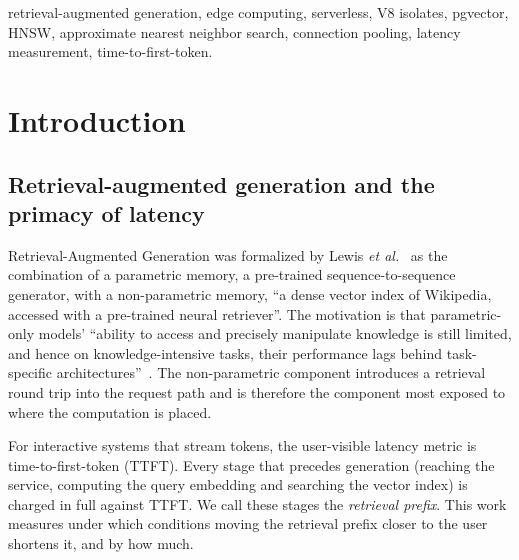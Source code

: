 \documentclass[conference]{IEEEtran}
\begin{document}
\begin{abstract}
beats the pooled Worker in three of the four remote regions. An additive latency model predicts the
centralized and near-replica topologies within 4 percent and underestimates the pooled and
unpooled paths by 7 to 42 percent; we report the calibrated parameters. Separate measurements of
the retrieval tier on one million MS~MARCO passage embeddings show HNSW serving 10 to 19 times
faster than IVFFlat at equal or higher recall where IVFFlat reaches Recall@10 of 0.93 or more and 82 times faster than an exact scan at
Recall@10 of 0.994, and confirm that the on-disk HNSW index size is fixed by page packing rather
than graph degree. Code,
harnesses and raw data are released.
\end{abstract}

\begin{IEEEkeywords}
retrieval-augmented generation, edge computing, serverless, V8 isolates, pgvector, HNSW,
approximate nearest neighbor search, connection pooling, latency measurement, time-to-first-token.
\end{IEEEkeywords}

\section{Introduction}

\subsection{Retrieval-augmented generation and the primacy of latency}
Retrieval-Augmented Generation was formalized by Lewis \emph{et al.}~\cite{lewis2020} as the
combination of a parametric memory, a pre-trained sequence-to-sequence generator, with a
non-parametric memory, ``a dense vector index of Wikipedia, accessed with a pre-trained neural
retriever''. The motivation is that parametric-only models' ``ability to access and precisely
manipulate knowledge is still limited, and hence on knowledge-intensive tasks, their performance
lags behind task-specific architectures''~\cite{lewis2020}. The non-parametric component
introduces a retrieval round trip into the request path and is therefore the component most
exposed to where the computation is placed.

For interactive systems that stream tokens, the user-visible latency metric is time-to-first-token
(TTFT). Every stage that precedes generation (reaching the service, computing the query embedding
and searching the vector index) is charged in full against TTFT. We call these stages the
\emph{retrieval prefix}. This work measures under which conditions moving the retrieval prefix
closer to the user shortens it, and by how much.
\end{document}
